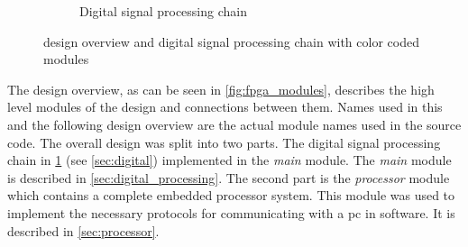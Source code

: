 \documentclass[12pt,a4paper,parskip=full,abstract=true,BCOR=12mm]{scrreprt}
\def\device#1{\mbox{\textit{#1}}}
\begin{document}
\begin{figure}[htb]
\begin{subfigure}[c]{.29\linewidth}
{
        }
        \caption{Digital signal processing chain}
        \label{fig:digital_chain}
    \end{subfigure}
    \caption[ design overview and digital signal processing chain]{ design overview and digital signal processing chain with color coded modules}
    \label{fig:fpga_overview}
\end{figure}

The design overview, as can be seen in \cref{fig:fpga_modules}, describes
the high level modules of the design and connections between them. Names used
in this and the following design overview are the actual module names used in the
source code. The overall
design was split into two parts. The digital signal processing chain
in \cref{fig:digital_chain} (see \cref{sec:digital}) implemented in the
\device{main} module. The \device{main} module is described in
\cref{sec:digital_processing}. The second part is the \device{processor} module
which contains a complete embedded processor system. This module was used to
implement the necessary protocols for communicating with a \gls{pc} in software.
It is described in \cref{sec:processor}.
\end{document}
